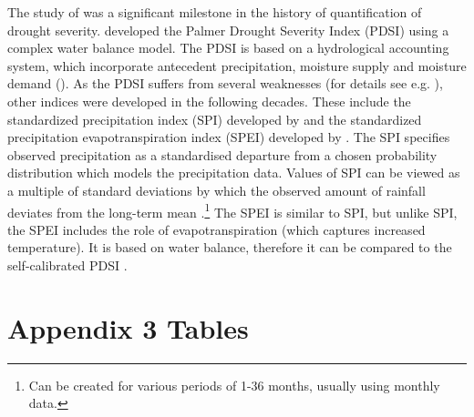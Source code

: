 \documentclass[a4paper,12pt]{article}
\begin{document}
The study of \cite{palmer1965} was a significant milestone in the history of quantification of drought severity. \cite{palmer1965} developed the Palmer Drought Severity Index (PDSI) using a complex water balance model. The PDSI is based on a hydrological accounting system, which incorporate antecedent precipitation, moisture supply and moisture demand (\citealp{Heim2002,palmer1965}). As the PDSI suffers from several weaknesses (for details see e.g. \citealt{Heim2002}), other indices were developed in the following decades. These include the standardized precipitation index (SPI) developed by \cite{SPI} and the standardized precipitation evapotranspiration index (SPEI) developed by \cite{SPEI}. The SPI specifies observed precipitation as a standardised departure from a chosen probability distribution which models the precipitation data. Values of SPI can be viewed as a multiple of standard deviations by which the observed amount of rainfall deviates from the long-term mean \citep{SPIonline}.\footnote{Can be created for various periods of 1-36 months, usually using monthly data.} The SPEI is similar to SPI, but unlike SPI, the SPEI includes the role of evapotranspiration (which captures increased temperature). It is based on water balance, therefore it can be compared to the self-calibrated PDSI \citep{SPEI}. 


\section{Appendix 3 Tables}
\end{document}
